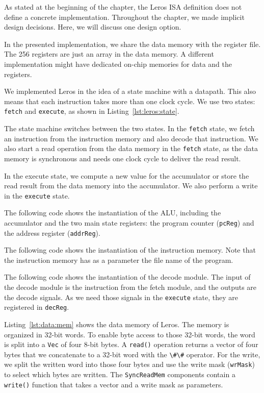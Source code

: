 \documentclass[%
    10pt,
    headinclude, footinclude=false,
    openright, %
    notitlepage,
    cleardoublepage=empty,
    headsepline,
    numbers=noenddot,
    bibliography=totoc, index=totoc,
    ]{scrbook}
\newcommand{\code}[1]{{\lstinline[basicstyle=\small\ttfamily]{#1}}}
\begin{document}
As stated at the beginning of the chapter, the Leros ISA definition does not define a
concrete implementation. Throughout the chapter, we made implicit design decisions.
Here, we will discuss one design option.

In the presented implementation, we share the data memory with the register file.
The 256 registers are just an array in the data memory. A different implementation might
have dedicated on-chip memories for data and the registers.

We implemented Leros in the idea of a state machine with a datapath.
This also means that each instruction takes more than one clock cycle.
We use two states: \code{fetch} and \code{execute}, as shown in Listing~\ref{lst:leros:state}.


\noindent The state machine switches between the two states.
In the \code{fetch} state, we fetch an instruction from the instruction
memory and also decode that instruction. We also start a read operation
from the data memory in the \code{fetch} state, as the data memory
is synchronous and needs one clock cycle to deliver the read result.

In the execute state, we compute a new value for the accumulator
or store the read result from the data memory into the accumulator.
We also perform a write in the \code{execute} state.

The following code shows the instantiation of the ALU, including the
accumulator and the two main state registers: the program counter (\code{pcReg})
and the address register (\code{addrReg}).


The following code shows the instantiation of the instruction memory.
Note that the instruction memory has as a parameter the file name
of the program.


The following code shows the instantiation of the decode module.
The input of the decode module is the instruction from the fetch
module, and the outputs are the decode signals. As we need those signals
in the \code{execute} state, they are registered in \code{decReg}.



Listing~\ref{lst:data:mem} shows the data memory of Leros.
The memory is organized in 32-bit words. To enable byte access to those
32-bit words, the word is split into a \code{Vec} of four 8-bit bytes.
A \code{read()} operation returns a vector of four bytes that we
concatenate to a 32-bit word with the \code{\#\#} operator.
For the write, we split the written word into those four bytes and
use the write mask (\code{wrMask}) to select which bytes are written.
The \code{SyncReadMem} components contain a \code{write()} function
that takes a vector and a write mask as parameters.
\end{document}
